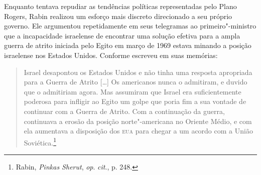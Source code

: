 Enquanto tentava repudiar as tendências políticas representadas pelo
Plano Rogers, Rabin realizou um esforço mais discreto direcionado a seu
próprio governo. Ele argumentou repetidamente em seus telegramas ao
primeiro"-ministro que a incapacidade israelense de encontrar uma solução
efetiva para a ampla guerra de atrito iniciada pelo Egito em março de
1969 estava minando a posição israelense nos Estados Unidos. Conforme
escreveu em suas memórias: 

\begin{quote}
Israel desapontou os Estados Unidos e não
tinha uma resposta apropriada para a Guerra de Atrito {[}\ldots{}{]} Os americanos
nunca o admitiram, e duvido que o admitiriam agora. Mas assumiram que
Israel era suficientemente poderosa para infligir ao Egito um golpe que
poria fim a sua vontade de continuar com a Guerra de Atrito. Com a
continuação da guerra, continuava a erosão da posição norte"-americana no
Oriente Médio, e com ela aumentava a disposição dos \textsc{eua} para chegar a um
acordo com a União Soviética.\footnote{Rabin, \textit{Pinkas Sherut}, 
\textit{op}. \textit{cit}., p. 248.}
\end{quote}


